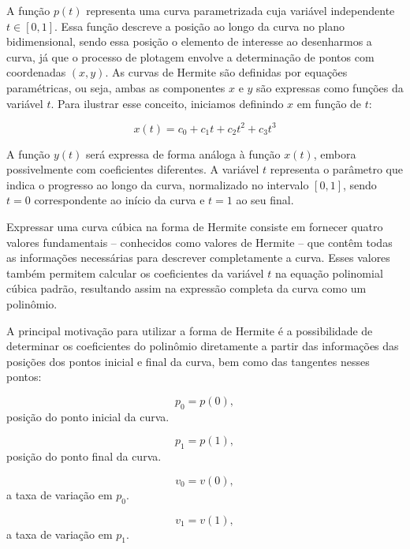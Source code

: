 A função $p(t)$ representa uma curva parametrizada cuja variável independente \( t \in [0,1] \). Essa função descreve a posição ao longo da curva no plano bidimensional, sendo essa posição o elemento de interesse ao desenharmos a curva, já que o processo de plotagem envolve a determinação de pontos com coordenadas $(x, y)$. As curvas de Hermite são definidas por equações paramétricas, ou seja, ambas as componentes $x$ e  $y$ são expressas como funções da variável $t$. Para ilustrar esse conceito, iniciamos definindo $x$ em função de $t$:

\begin{equation}
    x(t) = c_0 + c_1t + c_2t^2 + c_3t^3
\end{equation}

A função \( y(t) \) será expressa de forma análoga à função \( x(t) \), embora possivelmente com coeficientes diferentes. A variável \( t \) representa o parâmetro que indica o progresso ao longo da curva, normalizado no intervalo \( [0,1] \), sendo \( t = 0 \) correspondente ao início da curva e \( t = 1 \) ao seu final.

Expressar uma curva cúbica na forma de Hermite consiste em fornecer quatro valores fundamentais -- conhecidos como valores de Hermite -- que contêm todas as informações necessárias para descrever completamente a curva. Esses valores também permitem calcular os coeficientes da variável \( t \) na equação polinomial cúbica padrão, resultando assim na expressão completa da curva como um polinômio.

A principal motivação para utilizar a forma de Hermite é a possibilidade de determinar os coeficientes do polinômio diretamente a partir das informações das posições dos pontos inicial e final da curva, bem como das tangentes nesses pontos:


\begin{equation}
    p_0 = p(0),
\end{equation}
posição do ponto inicial da curva.

\begin{equation}
    p_1 = p(1),
\end{equation}
posição do ponto final da curva.

\begin{equation}
    v_0 = v(0),
\end{equation}
a taxa de variação em $p_0$.

\begin{equation}
    v_1 = v(1),
\end{equation}
a taxa de variação em $p_1$.


